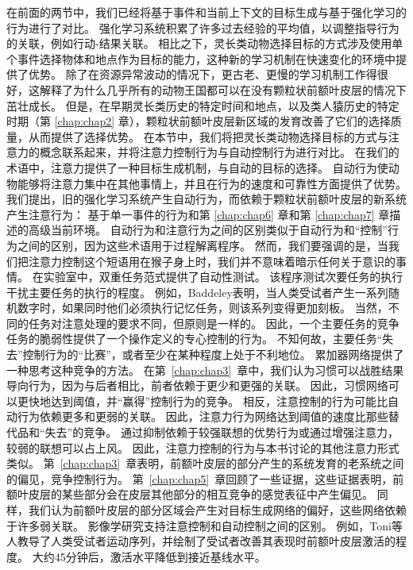 在前面的两节中，我们已经将基于事件和当前上下文的目标生成与基于强化学习的行为进行了对比。
强化学习系统积累了许多过去经验的平均值，以调整指导行为的关联，例如行动-结果关联。
相比之下，灵长类动物选择目标的方式涉及使用单个事件选择物体和地点作为目标的能力，这种新的学习机制在快速变化的环境中提供了优势。
除了在资源异常波动的情况下，更古老、更慢的学习机制工作得很好，这解释了为什么几乎所有的动物王国都可以在没有颗粒状前额叶皮层的情况下茁壮成长。
但是，在早期灵长类历史的特定时间和地点，以及类人猿历史的特定时期（第 \ref{chap:chap2} 章），颗粒状前额叶皮层新区域的发育改善了它们的选择质量，从而提供了选择优势。
在本节中，我们将把灵长类动物选择目标的方式与注意力的概念联系起来，并将注意力控制行为与自动控制行为进行对比。
在我们的术语中，注意力提供了一种目标生成机制，与自动的目标的选择。
自动行为使动物能够将注意力集中在其他事情上，并且在行为的速度和可靠性方面提供了优势。
我们提出，旧的强化学习系统产生自动行为，而依赖于颗粒状前额叶皮层的新系统产生注意行为：
基于单一事件的行为和第 \ref{chap:chap6} 章和第 \ref{chap:chap7} 章描述的高级当前环境。
自动行为和注意行为之间的区别类似于自动行为和“控制”行为之间的区别，因为这些术语用于过程解离程序。
然而，我们要强调的是，当我们把注意力控制这个短语用在猴子身上时，我们并不意味着暗示任何关于意识的事情。
在实验室中，双重任务范式提供了自动性测试。
该程序测试次要任务的执行干扰主要任务的执行的程度。
例如，Baddeley\cite{shallice1996domain}表明，当人类受试者产生一系列随机数字时，如果同时他们必须执行记忆任务，则该系列变得更加刻板。
当然，不同的任务对注意处理的要求不同，但原则是一样的。
因此，一个主要任务的竞争任务的脆弱性提供了一个操作定义的专心控制的行为。
不知何故，主要任务“失去”控制行为的“比赛”，或者至少在某种程度上处于不利地位。
累加器网络提供了一种思考这种竞争的方法。
在第~\ref{chap:chap3}~章中，我们认为习惯可以战胜结果导向行为，因为与后者相比，前者依赖于更少和更强的关联。
因此，习惯网络可以更快地达到阈值，并“赢得”控制行为的竞争。
相反，注意控制的行为可能比自动行为依赖更多和更弱的关联。
因此，注意力行为网络达到阈值的速度比那些替代品和“失去”的竞争。
通过抑制依赖于较强联想的优势行为或通过增强注意力，较弱的联想可以占上风。
因此，注意力控制的行为与本书讨论的其他注意力形式类似。
第~\ref{chap:chap3}~章表明，前额叶皮层的部分产生的系统发育的老系统之间的偏见，竞争控制行为。
第~\ref{chap:chap5}~章回顾了一些证据，这些证据表明，前额叶皮层的某些部分会在皮层其他部分的相互竞争的感觉表征中产生偏见。
同样，我们认为前额叶皮层的部分区域会产生对目标生成网络的偏好，这些网络依赖于许多弱关联。
影像学研究支持注意控制和自动控制之间的区别。
例如，Toni等人\cite{toni1998time}教导了人类受试者运动序列，并绘制了受试者改善其表现时前额叶皮层激活的程度。
大约45分钟后，激活水平降低到接近基线水平。
